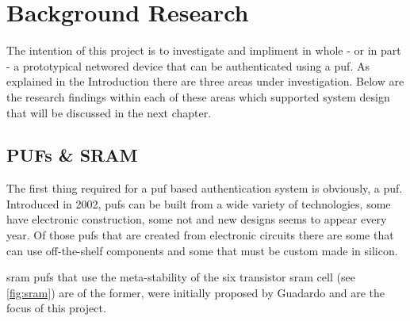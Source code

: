 
\chapter{Background Research} %

\label{ch:background} %


The intention of this project is to investigate and impliment in whole - or in
part - a prototypical networed device that can be authenticated using a \gls{puf}.
As explained in the Introduction there are three areas under investigation. Below
are the research findings within each of these areas which supported system
design that will be discussed in the next chapter.

\section{PUFs \& SRAM}

The first thing required for a \gls{puf} based authentication system is
obviously, a \gls{puf}.
Introduced in 2002\cite{pappu2002puf}, 
\glspl{puf} can be built from a wide variety of technologies, some have
electronic construction, some not and new designs seems to appear every year.
Of those \glspl{puf} that are created from electronic circuits there are some
that can use off-the-shelf components and some that must be custom made in
silicon. 

\gls{sram} \glspl{puf} that use the meta-stability of the six transistor
\gls{sram} cell (see \ref{fig:sram}) are of the former, were initially proposed by
Guadardo\cite{guajardo2009puf} and are the focus of this project.

